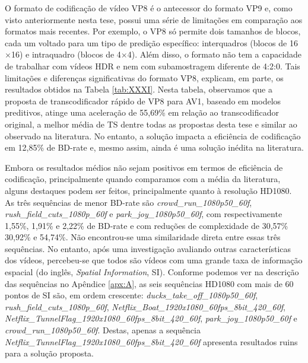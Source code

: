 O formato de codificação de vídeo VP8 é o antecessor do formato VP9 e, como visto anteriormente nesta tese, possui uma série de limitações em comparação aos formatos mais recentes. Por exemplo, o VP8 só permite dois tamanhos de blocos, cada um voltado para um tipo de predição específico: interquadros (blocos de 16$\times$16) e intraquadro (blocos de 4$\times$4). Além disso, o formato não tem a capacidade de trabalhar com vídeos HDR e nem com subamostragem diferente de 4:2:0. Tais limitações e diferenças significativas do  formato VP8, explicam, em parte, os resultados obtidos na Tabela \ref{tab:XXXI}. Nesta tabela, observamos que a proposta de transcodificador rápido de VP8 para AV1, baseado em modelos preditivos, atinge uma aceleração de 55,69\% em relação ao transcodificador original, a melhor média de TS dentre todas as propostas desta tese e similar ao observado na literatura. No entanto, a solução impacta a eficiência de codificação em 12,85\% de BD-rate e, mesmo assim, ainda é uma solução inédita na literatura.



Embora os resultados médios não sejam positivos em termos de eficiência de codificação, principalmente quando comparamos com a média da literatura, alguns destaques podem ser feitos, principalmente quanto à resolução HD1080. As três sequências de menor BD-rate são \textit{crowd\_run\_1080p50\_60f}, \textit{rush\_field\_cuts\_1080p\_60f} e \textit{park\_joy\_1080p50\_60f}, com respectivamente 1,55\%, 1,91\% e 2,22\% de BD-rate e com reduções de complexidade de 30,57\% 30,92\% e 54,74\%. Não encontrou-se uma similaridade direta entre essas três sequências. No entanto, após uma investigação avaliando outras características dos vídeos, percebeu-se que todos são vídeos com uma grande taxa de informação espacial (do inglês, \textit{Spatial Information}, SI). Conforme podemos ver na descrição das sequências no Apêndice \ref{apx:A}, as seis sequências HD1080 com mais de 60 pontos de SI são, em ordem crescente: \textit{ducks\_take\_off\_1080p50\_60f}, \textit{rush\_field\_cuts\_1080p\_60f}, \textit{Netflix\_Boat\_1920x1080\_60fps\_8bit\_420\_60f}, \textit{Netflix\_TunnelFlag\_1920x1080\_60fps\_8bit\_420\_60f}, \textit{park\_joy\_1080p50\_60f} e \textit{crowd\_run\_1080p50\_60f}. Destas, apenas a sequência \textit{Netflix\_TunnelFlag\_1920x1080\_60fps\_8bit\_420\_60f} apresenta resultados ruins para a solução proposta.

